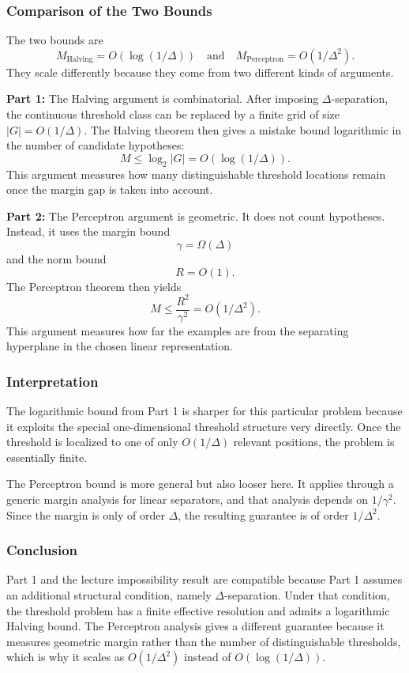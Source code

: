 \documentclass{article}
\begin{document}
\subsubsection{Comparison of the Two Bounds}

The two bounds are
$$
M_{\text{Halving}} = O(\log(1/\Delta))
\quad \text{and} \quad
M_{\text{Perceptron}} = O(1/\Delta^2).
$$
They scale differently because they come from two different kinds of arguments.

\textbf{Part 1: } The Halving argument is combinatorial. After imposing $\Delta$-separation, the
continuous threshold class can be replaced by a finite grid of size $|G| = O(1/\Delta)$. The
Halving theorem then gives a mistake bound logarithmic in the number of candidate hypotheses:
$$
M \leq \log_2 |G| = O(\log(1/\Delta)).
$$
This argument measures how many distinguishable threshold locations remain once the margin gap is
taken into account.

\textbf{Part 2: } The Perceptron argument is geometric. It does not count hypotheses. Instead, it
uses the margin bound
$$
\gamma = \Omega(\Delta)
$$
and the norm bound
$$
R = O(1).
$$
The Perceptron theorem then yields
$$
M \leq \frac{R^2}{\gamma^2} = O(1/\Delta^2).
$$
This argument measures how far the examples are from the separating hyperplane in the chosen
linear representation.

\subsubsection{Interpretation}

The logarithmic bound from Part 1 is sharper for this particular problem because it exploits the
special one-dimensional threshold structure very directly. Once the threshold is localized to one of
only $O(1/\Delta)$ relevant positions, the problem is essentially finite.

The Perceptron bound is more general but also looser here. It applies through a generic margin
analysis for linear separators, and that analysis depends on $1/\gamma^2$. Since the margin is only
of order $\Delta$, the resulting guarantee is of order $1/\Delta^2$.

\subsubsection{Conclusion}

Part 1 and the lecture impossibility result are compatible because Part 1 assumes an additional
structural condition, namely $\Delta$-separation. Under that condition, the threshold problem has a
finite effective resolution and admits a logarithmic Halving bound. The Perceptron analysis gives a
different guarantee because it measures geometric margin rather than the number of distinguishable
thresholds, which is why it scales as $O(1/\Delta^2)$ instead of $O(\log(1/\Delta))$.
\end{document}
